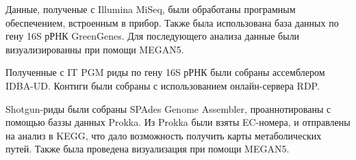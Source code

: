 Данные, полученые с Illumina MiSeq, были обработаны програмным обеспечением, встроенным в прибор. Также была использована база данных по гену 16S рРНК GreenGenes. Для последующего анализа данные были визуализированны при помощи MEGAN5.

Полученные с IT PGM  риды по гену 16S рРНК были собраны ассемблером IDBA-UD. Контиги были собраны с использованием онлайн-сервера RDP. 


Shotgun-риды были собраны SPAdes Genome Assembler, проаннотированы с помощью баззы данных Prokka. Из Prokka были взяты EC-номера, и отправлены на анализ в KEGG, что дало возможность получить карты метаболических путей. Также была проведена визуализация при помощи MEGAN5.


\clearpage
